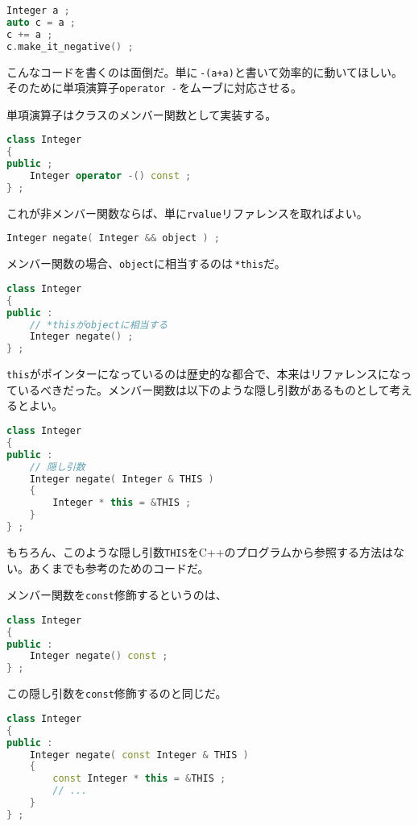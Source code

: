 \begin{lstlisting}[language={C++}]
Integer a ;
auto c = a ;
c += a ;
c.make_it_negative() ;
\end{lstlisting}

こんなコードを書くのは面倒だ。単に\,\texttt{-(a+a)}と書いて効率的に動いてほしい。そのために単項演算子\texttt{operator -}\,をムーブに対応させる。

単項演算子はクラスのメンバー関数として実装する。

\begin{lstlisting}[language={C++}]
class Integer
{
public ;
    Integer operator -() const ;
} ;
\end{lstlisting}

これが非メンバー関数ならば、単に\texttt{rvalue}リファレンスを取ればよい。

\begin{lstlisting}[language={C++}]
Integer negate( Integer && object ) ;
\end{lstlisting}

メンバー関数の場合、\texttt{object}に相当するのは\,\texttt{*this}だ。

\begin{lstlisting}[language={C++}]
class Integer
{
public :
    // *thisがobjectに相当する
    Integer negate() ;
} ;
\end{lstlisting}

\texttt{this}がポインターになっているのは歴史的な都合で、本来はリファレンスになっているべきだった。メンバー関数は以下のような隠し引数があるものとして考えるとよい。

\begin{lstlisting}[language={C++}]
class Integer
{
public :
    // 隠し引数
    Integer negate( Integer & THIS )
    {
        Integer * this = &THIS ;
    }
} ;
\end{lstlisting}

もちろん、このような隠し引数\texttt{THIS}をC++のプログラムから参照する方法はない。あくまでも参考のためのコードだ。

メンバー関数を\texttt{const}修飾するというのは、
\begin{lstlisting}[language={C++}]
class Integer 
{
public :
    Integer negate() const ;
} ;
\end{lstlisting}
この隠し引数を\texttt{const}修飾するのと同じだ。

\begin{lstlisting}[language={C++}]
class Integer
{
public :
    Integer negate( const Integer & THIS )
    {
        const Integer * this = &THIS ;
        // ...
    }
} ;
\end{lstlisting}

